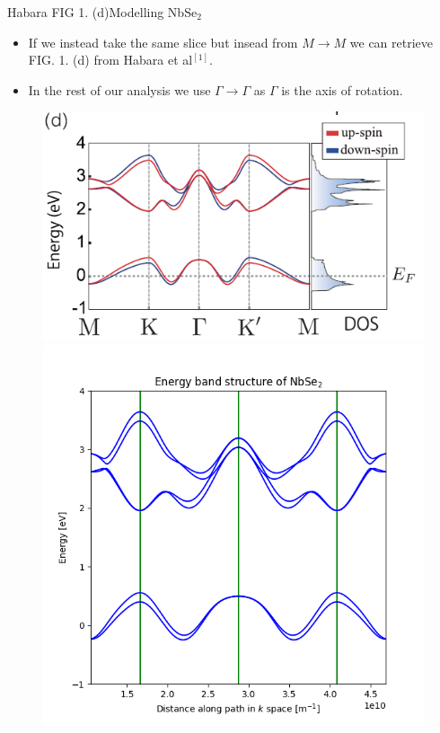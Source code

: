 \documentclass[9pt]{beamer}
\begin{document}
\begin{frame}{Habara FIG 1. (d)}{Modelling NbSe$_2$}
  \begin{itemize}
    \item If we instead take the same slice but insead from $M \rightarrow M$ we can retrieve FIG. 1. (d) from Habara et al$^{[1]}$.

    \item In the rest of our analysis we use $\Gamma \rightarrow \Gamma$ as $\Gamma$ is the axis of rotation.
  \end{itemize}

  \begin{figure}
  \centering
  \begin{minipage}{.5\textwidth}
    \centering
    \includegraphics[width=.9\linewidth]{Habara_evalues.png}
  \end{minipage}%
  \begin{minipage}{.5\textwidth}
    \centering
    \includegraphics[width=.9\linewidth]{our_Habara_evalues.png}
  \end{minipage}
  \end{figure}
\end{frame}
\end{document}

